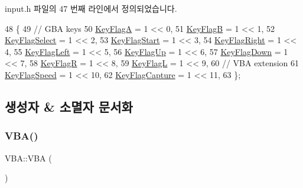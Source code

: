 input.\+h 파일의 47 번째 라인에서 정의되었습니다.


\begin{DoxyCode}
48 \{
49   \textcolor{comment}{// GBA keys}
50   \mbox{\hyperlink{class_v_b_a_a20a8479ee93dc52b1fbd911a13cb30a5a4006161734414cc3ea97edc3105c8231}{KeyFlagA}}       = 1 << 0,
51   \mbox{\hyperlink{class_v_b_a_a20a8479ee93dc52b1fbd911a13cb30a5a94baf7a0d970d139d3617120b54dd2b9}{KeyFlagB}}       = 1 << 1,
52   \mbox{\hyperlink{class_v_b_a_a20a8479ee93dc52b1fbd911a13cb30a5ad3ad5ac251007a09ec532ae097142252}{KeyFlagSelect}}  = 1 << 2,
53   \mbox{\hyperlink{class_v_b_a_a20a8479ee93dc52b1fbd911a13cb30a5a0d823a0b6b5e2a4dd17fc670c10daabd}{KeyFlagStart}}   = 1 << 3,
54   \mbox{\hyperlink{class_v_b_a_a20a8479ee93dc52b1fbd911a13cb30a5a441100ceee961ee31d4aedb0f3917bc6}{KeyFlagRight}}   = 1 << 4,
55   \mbox{\hyperlink{class_v_b_a_a20a8479ee93dc52b1fbd911a13cb30a5ad99be6497cdd8bc29f305fcd69a81500}{KeyFlagLeft}}    = 1 << 5,
56   \mbox{\hyperlink{class_v_b_a_a20a8479ee93dc52b1fbd911a13cb30a5a02b1e23bde2f5e6241fd64069322d05c}{KeyFlagUp}}      = 1 << 6,
57   \mbox{\hyperlink{class_v_b_a_a20a8479ee93dc52b1fbd911a13cb30a5a84eb49bded085472c16fc080c423be90}{KeyFlagDown}}    = 1 << 7,
58   \mbox{\hyperlink{class_v_b_a_a20a8479ee93dc52b1fbd911a13cb30a5ae74198fb73e9b0d06aca1dedcac42732}{KeyFlagR}}       = 1 << 8,
59   \mbox{\hyperlink{class_v_b_a_a20a8479ee93dc52b1fbd911a13cb30a5ad04b7c8e1cf8bb6053010c681bfa253d}{KeyFlagL}}       = 1 << 9,
60   \textcolor{comment}{// VBA extension}
61   \mbox{\hyperlink{class_v_b_a_a20a8479ee93dc52b1fbd911a13cb30a5a27ccfb3e8dfb99a74170dacd35b3f4df}{KeyFlagSpeed}}   = 1 << 10,
62   \mbox{\hyperlink{class_v_b_a_a20a8479ee93dc52b1fbd911a13cb30a5a5413c49ad0399cb0372eba4b7bf24dfc}{KeyFlagCapture}} = 1 << 11,
63 \};
\end{DoxyCode}


\subsection{생성자 \& 소멸자 문서화}
\mbox{\label{class_v_b_a_a70ffc29da53239a79cb4aab99805d0e1}} 
\subsubsection{\texorpdfstring{V\+B\+A()}{VBA()}}
{\footnotesize\ttfamily V\+B\+A\+::\+V\+BA (\begin{DoxyParamCaption}{ }\end{DoxyParamCaption})}



